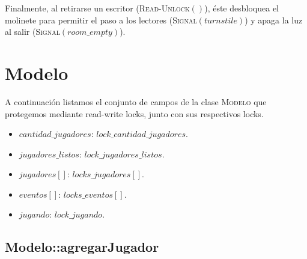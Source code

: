 \documentclass[a4paper,10pt,twoside]{article}
\newcommand{\Fn}[2]{\textsc{#1}$(#2)$}
\begin{document}
Finalmente, al retirarse un escritor (\Fn{Read-Unlock}{}), éste desbloquea el molinete para permitir el paso a los lectores (\Fn{Signal}{turnstile}) y apaga la luz al salir (\Fn{Signal}{room\_empty}). 




\section{Modelo}

A continuación listamos el conjunto de campos de la clase \textsc{Modelo} que protegemos mediante read-write locks, junto con sus respectivos locks.

\begin{itemize}
    \item{$cantidad\_jugadores$: $lock\_cantidad\_jugadores$.}
    \item{$jugadores\_listos$: $lock\_jugadores\_listos$.}
    \item{$jugadores[]$: $locks\_jugadores[]$.}
    \item{$eventos[]$: $locks\_eventos[]$.}
    \item{$jugando$: $lock\_jugando$.}    
\end{itemize}


\subsection{Modelo::agregarJugador}
\end{document}
